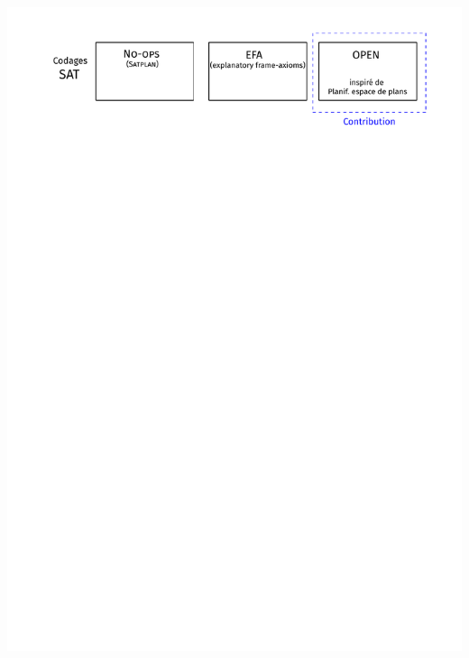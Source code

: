 \documentclass[english,french,usenames,dvipsnames]{beamer}
\begin{document}
\begin{frame}
\includegraphics[width=1\textwidth]{figures/coplas2018/cte-encodings-1.pdf}
\end{frame}
\end{document}
